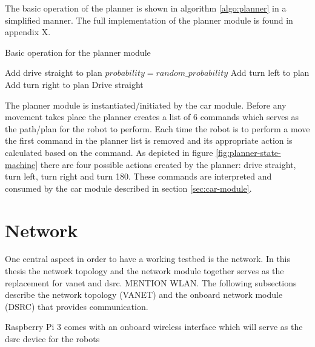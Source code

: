 \noindent The basic operation of the planner is shown in algorithm \ref{algo:planner} in a simplified manner. The full implementation of the planner module is found in appendix X. 

\begin{algorithm}[ht]
    \caption{Basic operation for the planner module}
    \label{algo:planner}
    \begin{algorithmic}
                \State Add drive straight to plan
            \Else
                \State $probability = random\_probability$
                    \State Add turn left to plan
                    \State Add turn right to plan
                \Else
                    \State Drive straight
                \EndIf
            \EndIf
        \EndIf
    \EndWhile
    \end{algorithmic}
\end{algorithm}

\noindent The planner module is instantiated/initiated by the car module. Before any movement takes place the planner creates a list of 6 commands which serves as the path/plan for the robot to perform. Each time the robot is to perform a move the first command in the planner list is removed and its appropriate action is calculated based on the command. As depicted in figure \ref{fig:planner-state-machine} there are four possible actions created by the planner: drive straight, turn left, turn right and turn 180\textdegree. These commands are interpreted and consumed by the car module described in section \ref{sec:car-module}.

\section{Network}
One central aspect in order to have a working testbed is the network. In this thesis the network topology and the network module together serves as the replacement for \gls{vanet} and \gls{dsrc}. MENTION WLAN. The following subsections describe the network topology (VANET) and the onboard network module (DSRC) that provides communication. 

Raspberry Pi 3 comes with an onboard wireless interface which will serve as the \gls{dsrc} device for the robots

